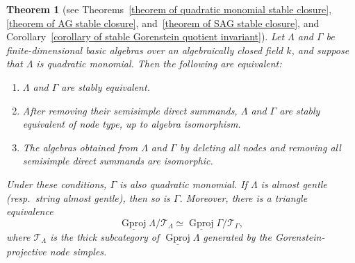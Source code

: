 \documentclass[11pt]{article}
\providecommand{\varLambda}{\Lambda}
\providecommand{\varGamma}{\Gamma}
\newtheorem{theorem}{Theorem}[section]
\theoremstyle{definition}
\begin{document}
	\begin{theorem}[see Theorems~\ref{theorem of quadratic monomial stable closure},
		\ref{theorem of AG stable closure}, and~\ref{theorem of SAG stable closure},
		and Corollary~\ref{corollary of stable Gorenstein quotient invariant}]
		\label{theorem of main results}
		Let $\varLambda$ and $\varGamma$ be finite-dimensional basic algebras over an algebraically closed field $k$, and suppose that $\varLambda$ is quadratic monomial. Then the following are equivalent:
		\begin{enumerate}
			\item $\varLambda$ and $\varGamma$ are stably equivalent.
			\item After removing their semisimple direct summands,
			$\varLambda$ and $\varGamma$ are stably equivalent of node type,
			up to algebra isomorphism.
			\item The algebras obtained from $\varLambda$ and $\varGamma$
			by deleting all nodes and removing all semisimple direct summands
			are isomorphic.
		\end{enumerate}
		Under these conditions, $\varGamma$ is also quadratic monomial. If $\varLambda$ is almost gentle \textup{(}resp.\ string almost gentle\textup{)}, then so is $\varGamma$. Moreover, there is a triangle equivalence
		\[
			\underline{\operatorname{Gproj}}\varLambda/
			\mathcal T_{\varLambda}
			\simeq
			\underline{\operatorname{Gproj}}\varGamma/
			\mathcal T_{\varGamma},
		\]
		where $\mathcal T_\varLambda$ is the thick subcategory of $\underline{\operatorname{Gproj}}\varLambda$ generated by the Gorenstein-projective node simples.
	\end{theorem}
\end{document}
